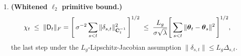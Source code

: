 \begin{lemma}
\begin{enumerate}[nosep,label=(\alph*),leftmargin=1.6em]
\begin{equation}
    \bC_t \;\preceq\; (1+\chi_t)^2\,\bCbar_t,
    \qquad\text{hence}\qquad
    \bar s_t^2(a)\;\le\;(1+\chi_t)^2\,s_t^2(a)\ \ \forall a.
  \end{equation}
  A predictable certificate $\bar\chi_t\ge\chi_t$ therefore satisfies
   in the exact case $\Calg_t=\bC_t$ with the uniform
  factor $u_t=(1+\bar\chi_t)^2$.
\item \textbf{(Whitened $\ell_2$ primitive bound.)}
  \begin{equation}\label{eq:chi-primitive}
    \chi_t \;\le\; \|\mathsf{D}_t\|_F
    = \Biggl[\,\sigma^{-2}\sum_{s<t}\|\delta_{s,t}\|_{\bar{\mathbf{C}}_t^{-1}}^2\,\Biggr]^{1/2}
    \;\le\;
    \frac{L_g}{\sigma\sqrt{\lambda}}
    \Biggl[\,\sum_{s<t}\|\boldsymbol{\theta}_t-\boldsymbol{\theta}_s\|^2\,\Biggr]^{1/2},
  \end{equation}
  the last step under the $L_g$-Lipschitz-Jacobian assumption
  $\|\delta_{s,t}\|\le L_g\Delta_{s,t}$.
\end{enumerate}
\end{lemma}
